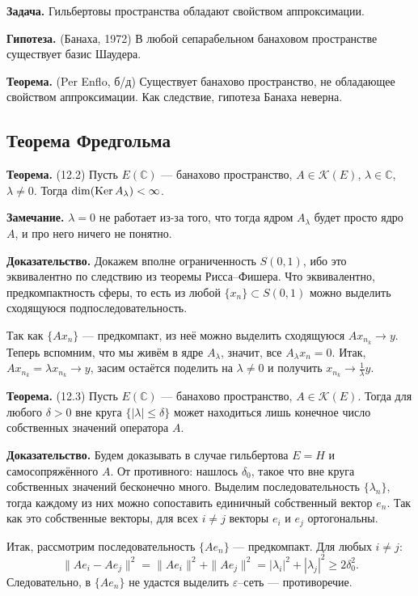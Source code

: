 \textbf{Задача.} Гильбертовы пространства обладают свойством аппроксимации.

\textbf{Гипотеза.} (Банаха, 1972) В любой сепарабельном банаховом пространстве существует базис Шаудера.

\textbf{Теорема.} (Per Enflo, б/д) Существует банахово пространство, не обладающее свойством аппроксимации.
Как следствие, гипотеза Банаха неверна.

\subsection{Теорема Фредгольма}

\label{th:12-2} \textbf{Теорема.} (12.2) Пусть $E(\mathbb C)$ --- банахово пространство, $A \in \mathcal K(E)$, $\lambda \in \mathbb C$, $\lambda \ne 0$.
Тогда $\dim(\operatorname{Ker} A_\lambda) < \infty$.

\textbf{Замечание.} $\lambda = 0$ не работает из-за того, что тогда ядром $A_\lambda$ будет просто ядро $A$, и про него ничего не понятно.

\textbf{Доказательство.} Докажем вполне ограниченность $S(0, 1)$, ибо это эквивалентно по следствию из теоремы Рисса--Фишера.
Что эквивалентно, предкомпактность сферы, то есть из любой $\{x_n\} \subset S(0, 1)$ можно выделить сходящуюся подпоследовательность.

Так как $\{Ax_n\}$ --- предкомпакт, из неё можно выделить сходящуюся $Ax_{n_k} \to y$.
Теперь вспомним, что мы живём в ядре $A_\lambda$, значит, все $A_\lambda x_n = 0$.
Итак, $Ax_{n_k} = \lambda x_{n_k} \to y$, засим остаётся поделить на $\lambda \ne 0$ и получить $x_{n_k} \to \frac{1}{\lambda} y$.

\QED

\label{th:12-3} \textbf{Теорема.} (12.3) Пусть $E(\mathbb C)$ --- банахово пространство, $A \in \mathcal K(E)$.
Тогда для любого $\delta > 0$ вне круга $\{|\lambda| \le \delta\}$ может находиться лишь конечное число собственных значений оператора $A$.

\textbf{Доказательство.} Будем доказывать в случае гильбертова $E = H$ и самосопряжённого $A$.
От противного: нашлось $\delta_0$, такое что вне круга собственных значений бесконечно много.
Выделим последовательность $\{\lambda_n\}$, тогда каждому из них можно сопоставить единичный собственный вектор $e_n$.
Так как это собственные векторы, для всех $i \ne j$ векторы $e_i$ и $e_j$ ортогональны.

Итак, рассмотрим последовательность $\{Ae_n\}$ --- предкомпакт.
Для любых $i \ne j$:
\[
    \|Ae_i - Ae_j\|^2 = \|Ae_i\|^2 + \|Ae_j\|^2 = |\lambda_i|^2 + |\lambda_j|^2 \ge 2\delta_0^2.
\]
Следовательно, в $\{Ae_n\}$ не удастся выделить $\varepsilon$--сеть --- противоречие.

